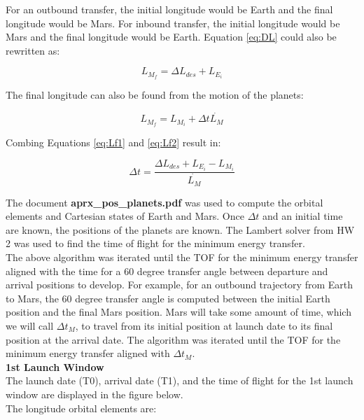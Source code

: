 \documentclass[conf]{new-aiaa}
\begin{document}
For an outbound transfer, the initial longitude would be Earth and the final longitude would be Mars. For inbound transfer, the initial longitude would be Mars and the final longitude would be Earth. Equation \ref{eq:DL} could also be rewritten as: 

\begin{equation}
    L_{M_f} = \Delta L_{des} + L_{E_i}
    \label{eq:Lf1}
\end{equation}

The final longitude can also be found from the motion of the planets: 

\begin{equation}
    L_{M_f} = L_{M_i} + \Delta t \dot{L_{M}}
    \label{eq:Lf2}
\end{equation}

Combing Equations \ref{eq:Lf1} and \ref{eq:Lf2} result in: 

\begin{equation}
    \Delta t = \frac{\Delta L_{des} + L_{E_i} - L_{M_i}}{ \dot{L_M} }
\end{equation}

The document \textbf{aprx\_pos\_planets.pdf} was used to compute the orbital elements and Cartesian states of Earth and Mars. Once $\Delta t$ and an initial time are known, the positions of the planets are known. The Lambert solver from HW 2 was used to find the time of flight for the minimum energy transfer. \\ 

The above algorithm was iterated until the TOF for the minimum energy transfer aligned with the time for a 60 degree transfer angle between departure and arrival positions to develop. For example, for an outbound trajectory from Earth to Mars, the 60 degree transfer angle is computed between the initial Earth position and the final Mars position. Mars will take some amount of time, which we will call $\Delta t_M$, to travel from its initial position at launch date to its final position at the arrival date. The algorithm was iterated until the TOF for the minimum energy transfer aligned with $\Delta t_M$.  \\ 

\textbf{1st Launch Window} \\ 

The launch date (T0), arrival date (T1), and the time of flight for the 1st launch window are displayed in the figure below. \\ 

The longitude orbital elements are: \\ 
\end{document}

